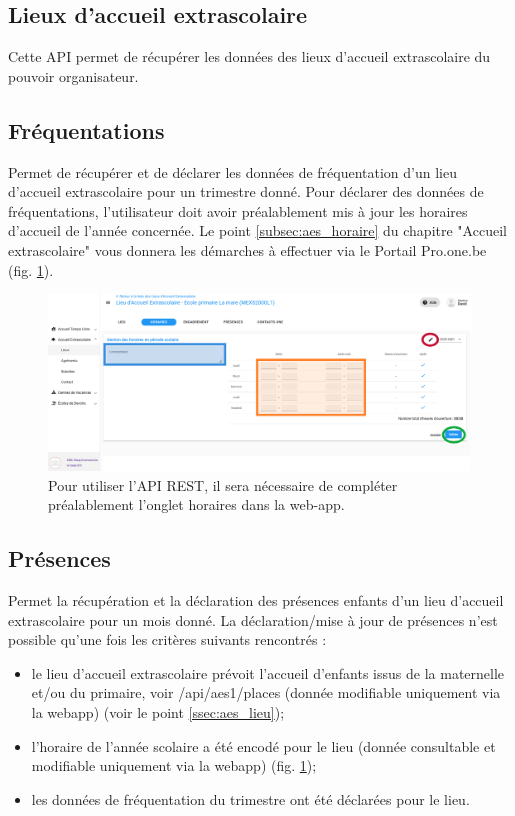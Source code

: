 \subsection{Lieux d'accueil extrascolaire}
Cette API permet de récupérer les données des lieux d'accueil extrascolaire du pouvoir organisateur. 


\subsection{Fréquentations}
Permet de récupérer et de déclarer les données de fréquentation d'un lieu d'accueil extrascolaire pour un trimestre donné. Pour déclarer des données de fréquentations, l'utilisateur doit avoir préalablement mis à jour les horaires d'accueil de l'année concernée. Le point \ref{subsec:aes_horaire} du chapitre "Accueil extrascolaire" vous donnera les démarches à effectuer via le Portail Pro.one.be (fig. \ref{fig:api_aes_horaires}).

\begin{figure}[htbp]
    \centering
    \includegraphics[width=15cm]{Images/aes/horaire2.png}
    \caption{Pour utiliser l'API REST, il sera nécessaire de compléter préalablement l'onglet horaires dans la web-app.}
    \label{fig:api_aes_horaires}
\end{figure}




\subsection{Présences}
Permet la récupération et la déclaration des présences enfants d'un lieu d'accueil extrascolaire pour un mois donné. La déclaration/mise à jour de présences n'est possible qu’une fois les critères suivants rencontrés :
\begin{itemize}
    \item le lieu d'accueil extrascolaire prévoit l'accueil d'enfants issus de la maternelle et/ou du primaire, voir /api/aes1/places (donnée modifiable uniquement via la webapp) (voir le point \ref{ssec:aes_lieu});
    \item l'horaire de l'année scolaire a été encodé pour le lieu (donnée consultable et modifiable uniquement via la webapp) (fig. \ref{fig:api_aes_horaires});
    \item les données de fréquentation du trimestre ont été déclarées pour le lieu.
\end{itemize}   

